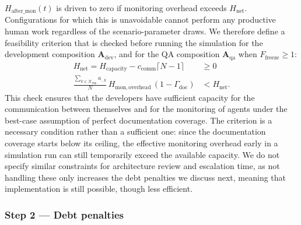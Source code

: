 \documentclass[smallextended]{svjour3}       %
\begin{document}
$H_\mathrm{after\_mon}(t)$ is driven to zero if monitoring overhead exceeds $H_\mathrm{net}$.
Configurations for which this is unavoidable cannot perform any productive human work regardless of the scenario-parameter draws. We therefore define a feasibility criterion that is checked before running the simulation for the development composition $\mathbf{A}_\mathrm{dev}$, and for the QA composition $\mathbf{A}_\mathrm{qa}$ when $F_\mathrm{freeze} \geq 1$:
\begin{align}
  H_\mathrm{net} = H_\mathrm{capacity} - c_\mathrm{comm}\lceil N-1 \rceil &\geq 0 \\
  \frac{\sum_{k \in \mathcal{K}_\mathrm{sup}} a_{\cdot,k}}{N}\,H_\mathrm{mon,overhead}\,
    (1 - \Gamma_\mathrm{doc}) &< H_\mathrm{net}.
  \label{eq:feas_monitoring}
\end{align}
This check ensures that the developers have sufficient capacity for the communication between
themselves and for the monitoring of agents under the best-case assumption of perfect documentation coverage. The criterion is a necessary condition rather than a sufficient one: since the documentation coverage starts below its ceiling, the effective monitoring overhead early in a simulation run can still temporarily exceed the available capacity. We do not specify similar constraints for architecture review and escalation time, as not handling these only increases the debt penalties we discuss next, meaning that implementation is still possible, though less efficient.

\subsubsection*{Step 2 --- Debt penalties}
\end{document}
